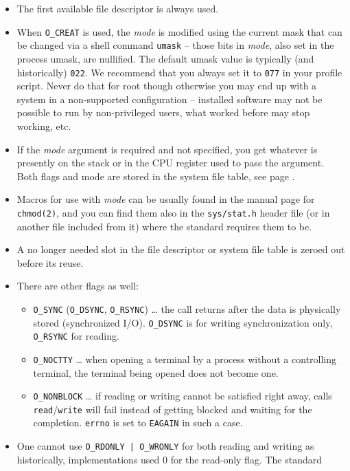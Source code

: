\begin{itemize}
\item The first available file descriptor is always used.  
\item When \texttt{O\_CREAT} is used, the \emph{mode} is modified using the
current mask that can be changed via a shell command \texttt{umask} -- those
bits in \emph{mode}, also set in the process umask, are nullified.  The
default umask value is typically (and historically) \texttt{022}.  We recommend
that you always set it to \texttt{077} in your profile script.  Never do that for
root though otherwise you may end up with a system in a non-supported
configuration -- installed software may not be possible to run by
non-privileged users, what worked before may stop working, etc.
\item If the \emph{mode} argument is required and not specified, you get
whatever is presently on the stack or in the CPU register used to pass the
argument.  Both flags and mode are stored in the system file table, see page
\pageref{OPENFILETABLES}.
\item Macros for use with \emph{mode} can be usually found in the manual page
for \texttt{chmod(2)}, and you can find them also in the \texttt{sys/stat.h}
header file (or in another file included from it) where the standard requires
them to be.
\item A no longer needed slot in the file descriptor or system file table is
zeroed out before its reuse.
\item There are other flags as well:
\begin{itemize}
\item \texttt{O\_SYNC} (\texttt{O\_DSYNC}, \texttt{O\_RSYNC}) \dots{} the call
returns after the data is physically stored (synchronized I/O).
\texttt{O\_DSYNC} is for writing synchronization only, \texttt{O\_RSYNC} for
reading.
\item \texttt{O\_NOCTTY} \dots{} when opening a terminal by a process without a
controlling terminal, the terminal being opened does not become one.
\item \label{O_NONBLOCK} \texttt{O\_NONBLOCK} \dots{} if reading or writing
cannot be satisfied right away, calls \texttt{read}/\texttt{write} will fail
instead of getting blocked and waiting for the completion.  \texttt{errno} is
set to \texttt{EAGAIN} in such a case.
\end{itemize}
\item One cannot use \texttt{O\_RDONLY | O\_WRONLY} for both reading and writing
as historically, implementations used 0 for the read-only flag.  The standard

\end{itemize}
